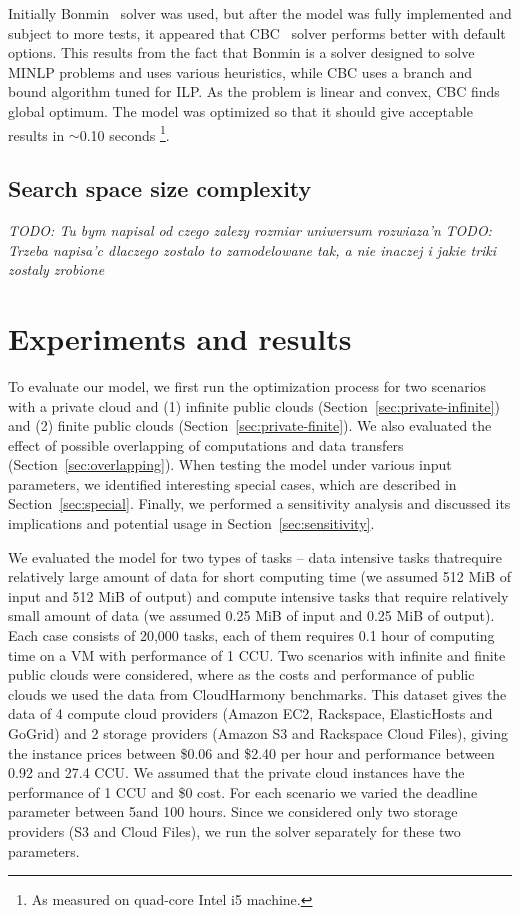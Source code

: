 {  Initially {Bonmin}~\cite{Bonami2008} solver was used, but after the model was fully implemented and subject to more tests, it appeared that CBC~\cite{cbc-solver} solver performs better with default options. This results from the fact that {Bonmin} is a solver designed to solve MINLP problems and uses various heuristics, while CBC uses a branch and bound algorithm tuned for ILP. As the problem is linear and convex, CBC finds global optimum. The model was optimized so that it should give acceptable results in $\sim$0.10 seconds \footnote{As measured on quad-core Intel i5 machine.}.

\subsection{Search space size complexity}

  \emph{TODO: Tu bym napisal od czego zalezy rozmiar uniwersum rozwiaza'n}
  \emph{TODO: Trzeba napisa'c dlaczego zostalo to zamodelowane tak, a nie inaczej i jakie triki zostaly zrobione}

\section{Experiments and results}
\label{sec:bot:results}
    
  To evaluate our model, we first run the optimization process for two scenarios with a private cloud and (1) infinite public clouds (Section~\ref{sec:private-infinite}) and (2) finite public clouds (Section~\ref{sec:private-finite}). We also evaluated the effect of possible overlapping of computations and data transfers (Section~\ref{sec:overlapping}). When testing the model under various input parameters, we identified interesting special cases, which are described in Section~\ref{sec:special}. Finally, we performed a sensitivity analysis and discussed its implications and potential usage in Section~\ref{sec:sensitivity}.
    
  We evaluated the model for two types of tasks -- data intensive tasks thatrequire relatively large amount of data for short computing time (we assumed 512 MiB of input and 512 MiB of output) and compute intensive tasks that require relatively small amount of data (we assumed 0.25 MiB of input and 0.25 MiB of output). Each case consists of 20,000 tasks, each of them requires 0.1 hour of computing time on a VM with performance of 1 CCU. Two scenarios with infinite and finite public clouds were considered, where as the costs and performance of public clouds we used the data from CloudHarmony benchmarks. This dataset gives the data of 4 compute cloud providers (Amazon EC2, Rackspace, ElasticHosts and GoGrid) and 2 storage providers (Amazon S3 and Rackspace Cloud Files), giving the instance prices between \$0.06 and \$2.40 per hour and performance between 0.92 and 27.4 CCU. We assumed that the private cloud instances have the performance of 1 CCU and \$0 cost.  For each scenario we varied the deadline parameter between 5and 100 hours.  Since we considered only two storage providers (S3 and Cloud Files), we run the solver separately for these two parameters.
    
}
